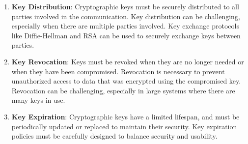 \documentclass[11pt]{article}
\begin{document}
\begin{enumerate}
\begin{enumerate}
              \item \textbf{Key Distribution}: Cryptographic keys must be securely distributed to all parties involved in the communication. Key distribution can be challenging, especially when there are multiple parties involved. Key exchange protocols like Diffie-Hellman and RSA can be used to securely exchange keys between parties.

              \item \textbf{Key Revocation}: Keys must be revoked when they are no longer needed or when they have been compromised. Revocation is necessary to prevent unauthorized access to data that was encrypted using the compromised key. Revocation can be challenging, especially in large systems where there are many keys in use.

              \item \textbf{Key Expiration}: Cryptographic keys have a limited lifespan, and must be periodically updated or replaced to maintain their security. Key expiration policies must be carefully designed to balance security and usability.

          \end{enumerate}

\end{enumerate}
\end{document}
